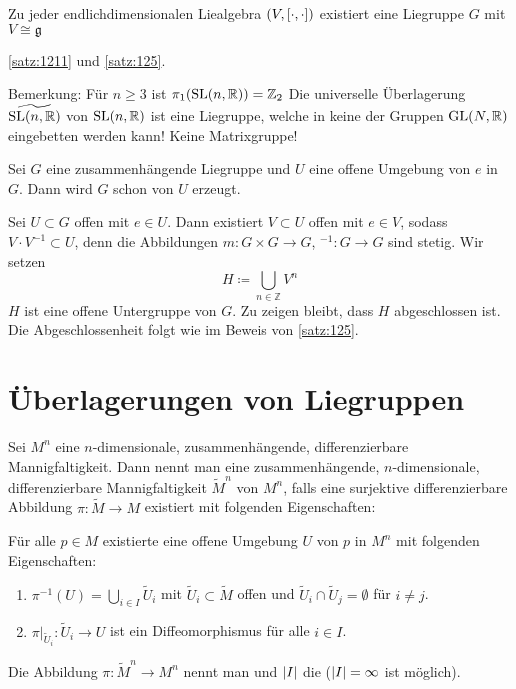 \begin{korollar}
	Zu jeder endlichdimensionalen Liealgebra $(V,\benbrace*{\cdot ,\cdot })$ existiert eine Liegruppe $G$ mit $V \cong \mathfrak{g}$
\end{korollar}
\begin{beweis}
	\autoref{satz:1211} und \autoref{satz:125}.
\end{beweis}

Bemerkung: Für $n \ge 3$ ist $\pi_1 \enbrace*{\SL(n,\mathbb{R})} = \mathbb{Z}_2$
Die universelle Überlagerung $\widetilde{\SL(n,\mathbb{R})}$ von $\SL(n,\mathbb{R})$ ist eine Liegruppe, welche in keine der Gruppen $\GL(N,\mathbb{R})$ eingebetten werden kann! Keine Matrixgruppe!

\begin{lemma}[label=lem:1213]
    Sei $G$ eine zusammenhängende Liegruppe und $U$ eine offene Umgebung von $e$ in $G$.
    Dann wird $G$ schon von $U$ erzeugt.
\end{lemma}
\begin{beweis}
    Sei $U \subset G$ offen mit $e \in U$.
    Dann existiert $V \subset U$ offen mit $e \in V$, sodass $V \cdot V^{-1} \subset U$, denn die Abbildungen $m \colon G \times G \to G$, $^{-1} \colon G \to G$ sind stetig.
    Wir setzen 
    \[
        H \coloneqq \bigcup_{n \in \mathbb{Z}} V^n
    \]
    $H$ ist eine offene Untergruppe von $G$.
    Zu zeigen bleibt, dass $H$ abgeschlossen ist.
    Die Abgeschlossenheit folgt wie im Beweis von \autoref{satz:125}.
\end{beweis}

\section{Überlagerungen von Liegruppen} %
\label{sec:13}

\begin{definition}
    Sei $M^n$ eine $n$-dimensionale, zusammenhängende, differenzierbare Mannigfaltigkeit.
    Dann nennt man eine zusammenhängende, $n$-dimensionale, differenzierbare Mannigfaltigkeit $\tilde{M}^n$  von $M^n$, falls eine surjektive differenzierbare Abbildung $\pi \colon \tilde{M} \to M$ existiert mit folgenden Eigenschaften:
    
    Für alle $p \in M$ existierte eine offene Umgebung $U$ von $p$ in $M^n$ mit folgenden Eigenschaften:
    \begin{enumerate}[1)]
        \item $\pi^{-1}(U) = \bigcup_{i \in I} \tilde{U}_i$ mit $\tilde{U}_i \subset \tilde{M}$ offen und $\tilde{U}_i \cap \tilde{U}_j = \emptyset$ für $i \neq j$.
        \item $\pi\big|_{\tilde{U}_i} \colon \tilde{U}_i \to U$ ist ein Diffeomorphismus für alle $i \in I$.
    \end{enumerate}
    Die Abbildung $\pi \colon \tilde{M}^n \to M^n$ nennt man  und $\abs*{I}$ die  ($\abs*{I}= \infty$ ist möglich).
\end{definition}

